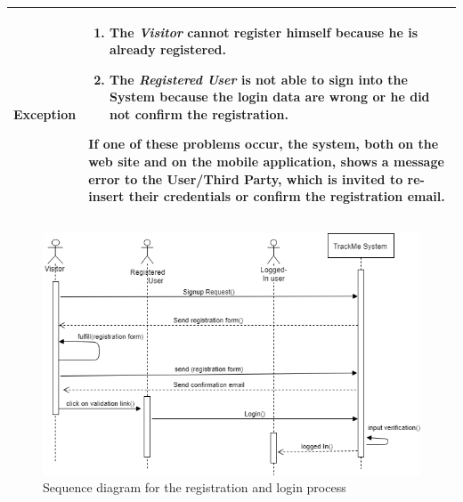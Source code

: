 \begin{table}[H]
\begin{tabular}{|p{3.5cm}|p{10.3cm}|}
    \hline
    \textbf{\large{Exception}} 			& \begin{enumerate}[leftmargin=0.5cm]
                                          	\item The \emph{Visitor} cannot register himself because he is already registered.
                                          	\item The \emph{Registered User} is not able to sign into the System because the login data are wrong or he did not confirm the registration.
                                            \end{enumerate}
    										If one of these problems occur, the system, both on the web site and on the mobile application, shows a message error to the User/Third Party, which is invited to re-insert their credentials or confirm the registration email.\\
    
    \hline
    
    \end{tabular}
	
\end{table}
\begin{figure}[H]

    \centering
    \includegraphics[scale=0.4]{./Pictures/login1.png}
    \caption{Sequence diagram for the registration and login process}
    
\end{figure}

